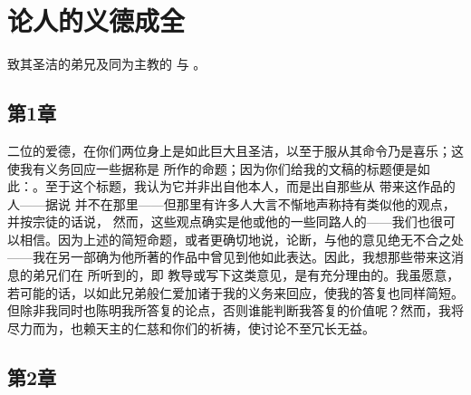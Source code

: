 
\chapter{论人的义德成全}


 致其圣洁的弟兄及同为主教的  与 。\par


\section{第1章}

二位的爱德，在你们两位身上是如此巨大且圣洁，以至于服从其命令乃是喜乐；这使我有义务回应一些据称是  所作的命题；因为你们给我的文稿的标题便是如此：。至于这个标题，我认为它并非出自他本人，而是出自那些从  带来这作品的人——据说  并不在那里——但那里有许多人大言不惭地声称持有类似他的观点，并按宗徒的话说，  然而，这些观点确实是他或他的一些同路人的——我们也很可以相信。因为上述的简短命题，或者更确切地说，论断，与他的意见绝无不合之处——我在另一部确为他所著的作品中曾见到他如此表达。因此，我想那些带来这消息的弟兄们在  所听到的，即  教导或写下这类意见，是有充分理由的。我虽愿意，若可能的话，以如此兄弟般仁爱加诸于我的义务来回应，使我的答复也同样简短。但除非我同时也陈明我所答复的论点，否则谁能判断我答复的价值呢？然而，我将尽力而为，也赖天主的仁慈和你们的祈祷，使讨论不至冗长无益。\par


\section{第2章}


\subsection{}


